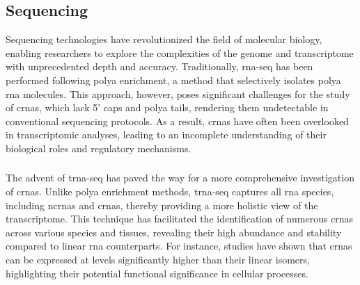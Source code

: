 \subsection{Sequencing }
\label{sec:circrna_sequencing}

Sequencing technologies have revolutionized the field of molecular biology,
enabling researchers to explore the complexities of the genome and
transcriptome with unprecedented depth and accuracy.
Traditionally, \gls{rna-seq} has been performed following \gls{polya}
enrichment, a method that selectively isolates \gls{polya} \gls{rna} molecules.
This approach, however, poses significant challenges for the study of
\glspl{crna}, which lack 5' caps and \gls{polya} tails, rendering them
undetectable in conventional sequencing protocols\supercite{guo_expanded_2014}.
As a result, \glspl{crna} have often been overlooked in transcriptomic
analyses, leading to an incomplete understanding of their biological roles and
regulatory mechanisms.

\subsubsection{}
The advent of \gls{trna-seq} has paved the way for a more comprehensive
investigation of \glspl{crna}.
Unlike \gls{polya} enrichment methods, \gls{trna-seq} captures all \gls{rna}
species, including \glspl{ncrna} and \glspl{crna}, thereby providing a more
holistic view of the transcriptome\supercite{panda_identification_2017}.
This technique has facilitated the identification of numerous \glspl{crna}
across various species and tissues, revealing their high abundance and
stability compared to linear \gls{rna}
counterparts\supercite{liu_circular_2016,cao_expression_2018}.
For instance, studies have shown that \glspl{crna} can be expressed at levels
significantly higher than their linear isomers, highlighting their potential
functional significance in cellular processes\supercite{liu_circular_2016}.
